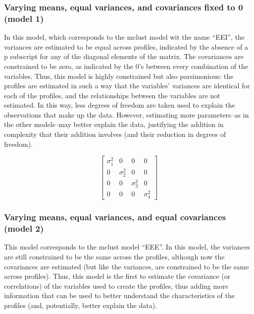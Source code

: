 \documentclass[]{book}
\theoremstyle{definition}
\theoremstyle{definition}
\theoremstyle{definition}
\theoremstyle{remark}
\begin{document}
\subsubsection{Varying means, equal variances, and covariances fixed to
0 (model
1)}\label{varying-means-equal-variances-and-covariances-fixed-to-0-model-1}

In this model, which corresponds to the mclust model wit the name
``EEI'', the variances are estimated to be equal across profiles,
indicated by the absence of a p subscript for any of the diagonal
elements of the matrix. The covariances are constrained to be zero, as
indicated by the 0's between every combination of the variables. Thus,
this model is highly constrained but also parsimonious: the profiles are
estimated in such a way that the variables' variances are identical for
each of the profiles, and the relationships between the variables are
not estimated. In this way, less degrees of freedom are taken used to
explain the observations that make up the data. However, estimating more
parameters--as in the other models--may better explain the data,
justifying the addition in complexity that their addition involves (and
their reduction in degrees of freedom).

\[
\left[ \begin{matrix} { \sigma  }_{ 1 }^{ 2 } & 0 & 0 & 0 \\ 0 & { \sigma  }_{ 2 }^{ 2 } & 0 & 0 \\ 0 & 0 & { \sigma  }_{ 3 }^{ 2 } & 0 \\ 0 & 0 & 0 & { \sigma  }_{ 4 }^{ 2 } \end{matrix} \right] 
\]

\subsubsection{Varying means, equal variances, and equal covariances
(model
2)}\label{varying-means-equal-variances-and-equal-covariances-model-2}

This model corresponds to the mclust model ``EEE''. In this model, the
variances are still constrained to be the same across the profiles,
although now the covariances are estimated (but like the variances, are
constrained to be the same across profiles). Thus, this model is the
first to estimate the covariance (or correlations) of the variables used
to create the profiles, thus adding more information that can be used to
better understand the characteristics of the profiles (and, potentially,
better explain the data).
\end{document}
